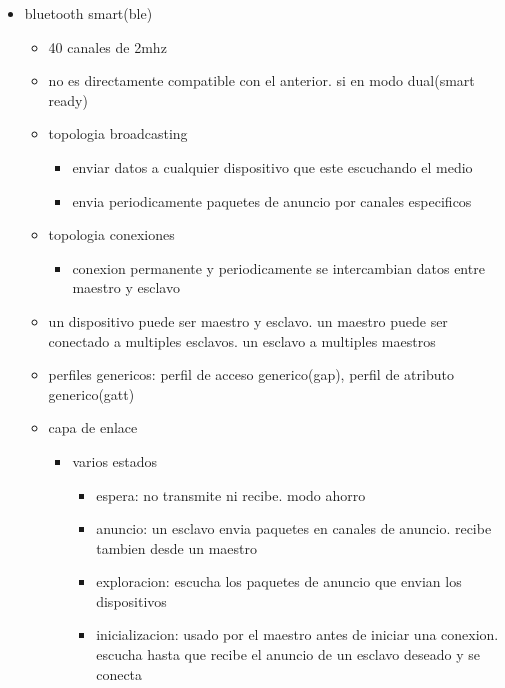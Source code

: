 \documentclass[11pt]{article}
\begin{document}
\begin{itemize}
\begin{itemize}
\begin{itemize}
\begin{itemize}
\end{itemize}
\end{itemize}
\end{itemize}
\item bluetooth smart(ble)
\begin{itemize}
\item 40 canales de 2mhz
\item no es directamente compatible con el anterior. si en modo dual(smart ready)
\item topologia broadcasting
\begin{itemize}
\item enviar datos a cualquier dispositivo que este escuchando el medio
\item envia periodicamente paquetes de anuncio por canales especificos
\end{itemize}
\item topologia conexiones
\begin{itemize}
\item conexion permanente y periodicamente se intercambian datos entre maestro y esclavo
\end{itemize}
\item un dispositivo puede ser maestro y esclavo. un maestro puede ser conectado a multiples esclavos. un esclavo a multiples maestros
\item perfiles genericos: perfil de acceso generico(gap), perfil de atributo generico(gatt)
\item capa de enlace
\begin{itemize}
\item varios estados
\begin{itemize}
\item espera: no transmite ni recibe. modo ahorro
\item anuncio: un esclavo envia paquetes en canales de anuncio. recibe tambien desde un maestro
\item exploracion: escucha los paquetes de anuncio que envian los dispositivos
\item inicializacion: usado por el maestro antes de iniciar una conexion. escucha hasta que recibe el anuncio de un esclavo deseado y se conecta
\end{itemize}
\end{itemize}
\end{itemize}
\end{itemize}
\end{document}
